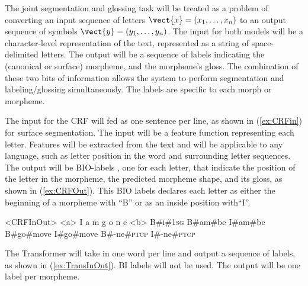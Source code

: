 The joint segmentation and glossing task will be treated as a problem of converting an input sequence of letters $\vect{x} = (x_1, \ldots, x_n)$ to an output sequence of symbols $\vect{y} = (y_1, \ldots, y_n)$. The input for both models will be a character-level representation of the text, represented as a string of space-delimited letters. The output will be a sequence of labels indicating the (canonical or surface) morpheme, and the morpheme's gloss. The combination of these two bits of information allows the system to perform segmentation and labeling/glossing simultaneously. The labels are specific to each morph or morpheme. %

The input for the CRF will fed as one sentence per line, as shown in (\ref{ex:CRFin}) for surface segmentation. The input will be a feature function representing each letter. Features will be extracted from the text and will be applicable to any language, such as letter position in the word and surrounding letter sequences. The output will be BIO-labels \citep{ramshaw1999}, one for each letter, that indicate the position of the letter in the morpheme, the predicted morpheme shape, and its gloss, as shown in (\ref{ex:CRFOut}). This BIO labels declares each letter as either the beginning of a morpheme with ``B'' or as an inside position with``I''. 

\begin{singlespace}
\pex<CRFInOut>   
\label{ex:CRFInOut}
\a<a> \hspace{7 mm} I \hspace{13 mm} a \hspace{14 mm} m \hspace{15 mm} g \hspace{18 mm} o \hspace{20 mm} n \hspace{19 mm} e 
\label{ex:CRFin}
\a<b> B\#i\#1\textsc{sg} \hspace{.25 mm} B\#am\#be \hspace{.25 mm} I\#am\#be \hspace{.25 mm} B\#go\#move \hspace{.25 mm} I\#go\#move \hspace{.25 mm} B\#-ne\#\textsc{ptcp} \hspace{.25 mm} I\#-ne\#\textsc{ptcp}
\label{ex:CRFOut}
\xe
\end{singlespace}

The Transformer will take in one word per line and output a sequence of labels, as shown in (\ref{ex:TransInOut}). BI labels will not be used. The output will be one label per morpheme. 

